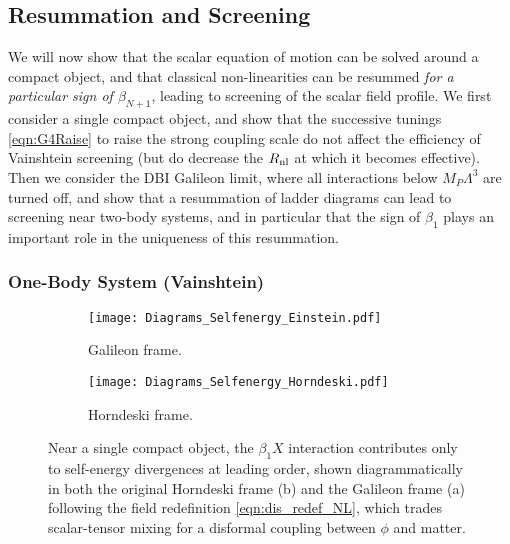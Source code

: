 \documentclass[11pt]{article}
\begin{document}
\subsection{Resummation and Screening}
\label{sec:screening}

We will now show that the scalar equation of motion can be solved around a compact object, and that classical non-linearities can be resummed \emph{for a particular sign of $\beta_{N+1}$}, leading to screening of the scalar field profile. 
We first consider a single compact object, and show that the successive tunings \eqref{eqn:G4Raise} to raise the strong coupling scale do not affect the efficiency of Vainshtein screening (but do decrease the $R_{\rm nl}$ at which it becomes effective). 
Then we consider the DBI Galileon limit, where all interactions below $M_P \Lambda^3$ are turned off, and show that a resummation of ladder diagrams can lead to screening near two-body systems, and in particular that the sign of $\beta_1$ plays an important role  in the uniqueness of this resummation. 



\subsubsection{One-Body System (Vainshtein)}
\label{sec:Vainshtein}


\begin{figure}
 \centering
\qquad \qquad
     \begin{subfigure}[b]{0.3\textwidth}
         \centering
\texttt{[image: Diagrams\_Selfenergy\_Einstein.pdf]}
         \caption{Galileon frame.}
     \end{subfigure}
     \hfill
     \begin{subfigure}[b]{0.3\textwidth}
         \centering
\texttt{[image: Diagrams\_Selfenergy\_Horndeski.pdf]}
         \caption{Horndeski frame.}
     \end{subfigure}
     \qquad\qquad
\caption{
Near a single compact object, the $\beta_1 X$ interaction contributes only to self-energy divergences at leading order, shown diagrammatically in both the original Horndeski frame (b) and the Galileon frame (a) following the field redefinition \eqref{eqn:dis_redef_NL}, which trades scalar-tensor mixing for a disformal coupling between $\phi$ and matter. 
}
\label{fig:selfenergy}
\end{figure}
\end{document}

